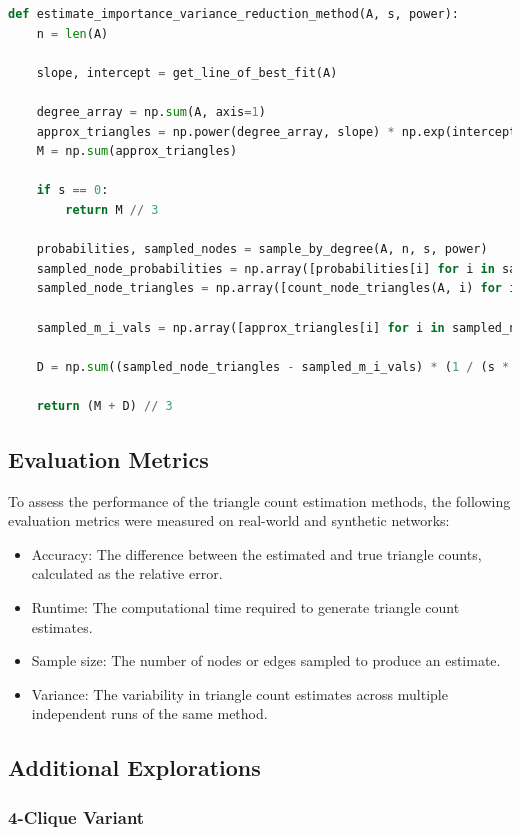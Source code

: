 \documentclass[11pt]{article}
\begin{document}
\begin{lstlisting}[language=Python]
def estimate_importance_variance_reduction_method(A, s, power):
    n = len(A)

    slope, intercept = get_line_of_best_fit(A)

    degree_array = np.sum(A, axis=1)
    approx_triangles = np.power(degree_array, slope) * np.exp(intercept)
    M = np.sum(approx_triangles)

    if s == 0:
        return M // 3

    probabilities, sampled_nodes = sample_by_degree(A, n, s, power)
    sampled_node_probabilities = np.array([probabilities[i] for i in sampled_nodes])
    sampled_node_triangles = np.array([count_node_triangles(A, i) for i in sampled_nodes])

    sampled_m_i_vals = np.array([approx_triangles[i] for i in sampled_nodes])

    D = np.sum((sampled_node_triangles - sampled_m_i_vals) * (1 / (s * sampled_node_probabilities)))

    return (M + D) // 3
\end{lstlisting}

\subsection{Evaluation Metrics}

To assess the performance of the triangle count estimation methods, the following evaluation metrics were measured on real-world and synthetic networks:

\begin{itemize}
\item Accuracy: The difference between the estimated and true triangle counts, calculated as the relative error.
\item Runtime: The computational time required to generate triangle count estimates.
\item Sample size: The number of nodes or edges sampled to produce an estimate.
\item Variance: The variability in triangle count estimates across multiple independent runs of the same method.
\end{itemize}

\subsection{Additional Explorations}

\subsubsection{4-Clique Variant}
\end{document}
